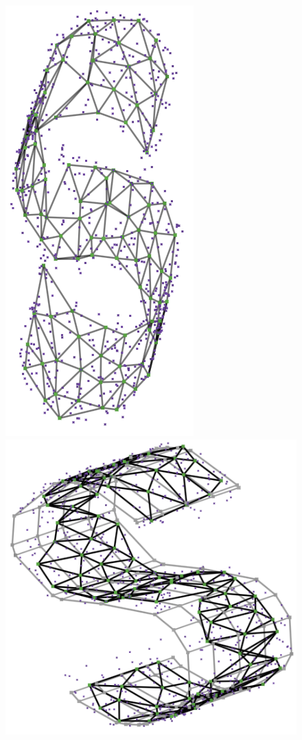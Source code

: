 \documentclass[
  12pt]{article}
\begin{document}
\begin{figure}[H]
%
\begin{minipage}{0.25\linewidth}
\includegraphics{figures/scurve/sc_trimap_best_1.png}\end{minipage}%
%
\begin{minipage}{0.25\linewidth}
\includegraphics{figures/scurve/sc_trimap_best_2.png}\end{minipage}%

\end{figure}
\end{document}
